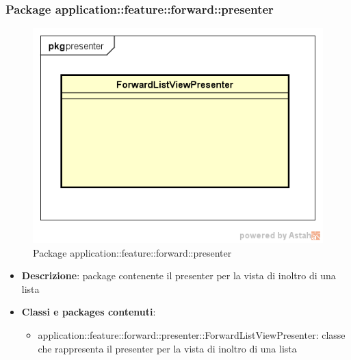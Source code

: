 \subsubsection{Package application::feature::forward::presenter}
\label{Package application::feature::forward::presenter}
\begin{figure}[H]
	\centering
	\includegraphics[scale=0.5]{Sezioni/Packages/Application/forward_presenter.png}
	\caption{Package application::feature::forward::presenter}
\end{figure}
\begin{itemize}
	\item \textbf{Descrizione}: package contenente il presenter per la vista di inoltro di una lista
	\item \textbf{Classi e packages contenuti}:
	\begin{itemize}
	\item application::feature::forward::presenter::ForwardListViewPresenter: classe che rappresenta il presenter per la vista di inoltro di una lista
	\end{itemize}
\end{itemize}

